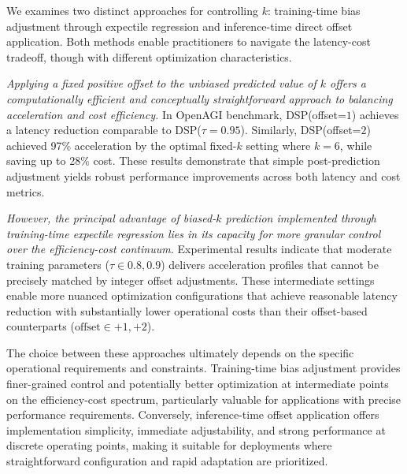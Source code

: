 We examines two distinct approaches for controlling $k$: training-time bias adjustment through expectile regression and inference-time direct offset application. Both methods enable practitioners to navigate the latency-cost tradeoff, though with different optimization characteristics.

\textit{Applying a fixed positive offset to the unbiased predicted value of $k$ offers a computationally efficient and conceptually straightforward approach to balancing acceleration and cost efficiency.} In OpenAGI benchmark, DSP(offset=$1$) achieves a latency reduction comparable to DSP($\tau=0.95$). Similarly, DSP(offset=$2$) achieved 97\% acceleration by the optimal fixed-$k$ setting where $k=6$, while saving up to 28\% cost. These results demonstrate that simple post-prediction adjustment yields robust performance improvements across both latency and cost metrics.

\textit{However, the principal advantage of biased-$k$ prediction implemented through training-time expectile regression lies in its capacity for more granular control over the efficiency-cost continuum.} Experimental results indicate that moderate training parameters ($\tau \in {0.8, 0.9}$) delivers acceleration profiles that cannot be precisely matched by integer offset adjustments. These intermediate settings enable more nuanced optimization configurations that achieve reasonable latency reduction with substantially lower operational costs than their offset-based counterparts ($\text{offset} \in {+1, +2}$).

The choice between these approaches ultimately depends on the specific operational requirements and constraints. Training-time bias adjustment provides finer-grained control and potentially better optimization at intermediate points on the efficiency-cost spectrum, particularly valuable for applications with precise performance requirements. Conversely, inference-time offset application offers implementation simplicity, immediate adjustability, and strong performance at discrete operating points, making it suitable for deployments where straightforward configuration and rapid adaptation are prioritized.

